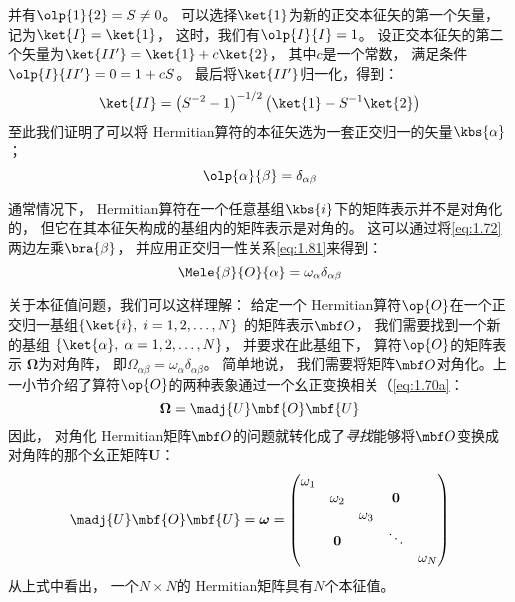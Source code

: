 \begin{enumerate}[]
 并有$\olp{1}{2} = S \neq 0$。
 可以选择$\ket{1}$为新的正交本征矢的第一个矢量，
 记为$\ket{I} = \ket{1}$，
 这时，我们有$\olp{I}{I} = 1$。
 设正交本征矢的第二个矢量为$\ket{II^\prime} = \ket{1} + c\ket{2}$，
 其中$c$是一个常数，
 满足条件$\olp{I}{II^\prime} = 0 = 1+cS$。
 最后将$\ket{II^\prime}$归一化，得到：
 \begin{equation}
     \ket{II} = \left(S^{-2}-1\right)^{-1/2}\left(\ket{1}-S^{-1}\ket{2}\right)
     \label{eq:1.80}
 \end{equation}
 至此我们证明了可以将 Hermitian算符的本征矢选为一套正交归一的矢量$\kbs{\alpha}$；
 \begin{equation}
     \olp{\alpha}{\beta} = \delta_{\alpha\beta}
     \label{eq:1.81}
 \end{equation}
\end{enumerate}

通常情况下，
Hermitian算符在一个任意基组$\kbs{i}$下的矩阵表示并不是对角化的，
但它在其本征矢构成的基组内的矩阵表示是对角的。
这可以通过将\autoref{eq:1.72}两边左乘$\bra{\beta}$，
并应用正交归一性关系\autoref{eq:1.81}来得到：
\begin{equation}
 \Mele{\beta}{O}{\alpha} = \omega_\alpha\delta_{\alpha\beta}
 \label{eq:1.82}
\end{equation}

关于本征值问题，我们可以这样理解：
给定一个 Hermitian算符$\op{O}$在一个正交归一基组$\left\{\ket{i},\; i = 1, 2, \dots, N\right\}$ 的矩阵表示$\mbf O$，
我们需要找到一个新的基组 $\left\{\ket{\alpha},\; \alpha = 1, 2, \dots, N\right\}$，
并要求在此基组下，
算符$\op{O}$的矩阵表示 $\boldsymbol\Omega$为对角阵，
即$\Omega_{\alpha\beta} = \omega_\alpha\delta_{\alpha\beta}$。
简单地说，
我们需要将矩阵$\mbf O$对角化。上一小节介绍了算符$\op{O}$的两种表象通过一个幺正变换相关（\autoref{eq:1.70a}：
\[\boldsymbol\Omega = \madj{U}\mbf{O}\mbf{U}\]
因此，
对角化 Hermitian矩阵$\mbf O$的问题就转化成了\emph{寻找}能够将$\mbf O$变换成对角阵的那个幺正矩阵$\mathbf{U}$：
\begin{equation}
 \madj{U}\mbf{O}\mbf{U} = \boldsymbol\omega = \begin{pmatrix}
     \omega_1     & & & &\\
          &\omega_2 &     &\mathbf{0} &\\
          & &\omega_3 & &\\
          &\mathbf{0} & & \ddots & \\
          & &     & &\omega_N
 \end{pmatrix}
 \label{eq:1.83}
\end{equation}
从上式中看出，
一个$N\times N$的 Hermitian矩阵具有$N$个本征值。

